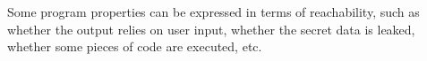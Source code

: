  
 Some program properties can be expressed in terms of reachability,
such as
whether the output relies on user input, whether the secret data is leaked, 
whether some pieces of code are executed, etc.

